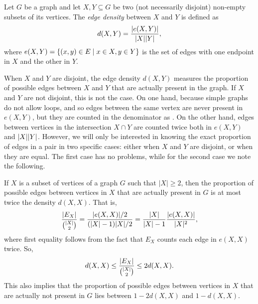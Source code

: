         \begin{definition} \label{def:density}
            Let $G$ be a graph and let $X, Y \subseteq G$ be two (not necessarily disjoint) non-empty subsets of its vertices.
            The \emph{edge density} between $X$ and $Y$ is defined as
            \[
                d(X, Y) = \frac{| e(X, Y) |}{|X| |Y|},
            \]
            where $e(X, Y) = \{ ( x, y ) \in E \mid x \in X, y \in Y \}$ is the set of edges with one endpoint in
            $X$ and the other in $Y$.
        \end{definition}

        When $X$ and $Y$ are disjoint, the edge density $d(X, Y)$ measures the proportion of possible edges between $X$
        and $Y$ that are actually present in the graph.
        If $X$ and $Y$ are not disjoint, this is not the case.
        On one hand, because simple graphs do not allow loops, and so edges between the same vertex are never present in
        $e(X,Y)$, but they are counted in the denominator as .
        On the other hand, edges between vertices in the intersection $X \cap Y$ are counted twice both in $e(X,Y)$
        and $| X || Y |$.
        However, we will only be interested in knowing the exact proportion of edges in a pair in two specific cases:
        either when $X$ and $Y$ are disjoint, or when they are equal.
        The first case has no problems, while for the second case we note the following.

        \begin{remark} \label{rmk:density_vs_real_density}
            If $X$ is a subset of vertices of a graph $G$ such that $|X| \geq 2$, then the proportion of possible edges
            between vertices in $X$ that are actually present in $G$ is at most twice the density $d(X, X)$.
            That is,
            \[
                \frac{| E_X |}{{|X| \choose 2}}
                    = \frac{| e(X, X) | / 2}{( |X|-1 )|X| / 2}
                    = \frac{|X|}{|X|-1} \frac{| e(X, X) |}{|X|^2},
            \]
            where first equality follows from the fact that $E_X$ counts each edge in $e(X, X)$ twice.
            So,
            \[
                d(X, X)
                    \leq \frac{| E_X |}{{|X| \choose 2}}
                    \leq 2 d(X, X).
            \]
            This also implies that the proportion of possible edges between vertices in $X$ that are actually not present
            in $G$ lies between $1 - 2 d(X,X)$ and $1 - d(X,X)$.
        \end{remark}

